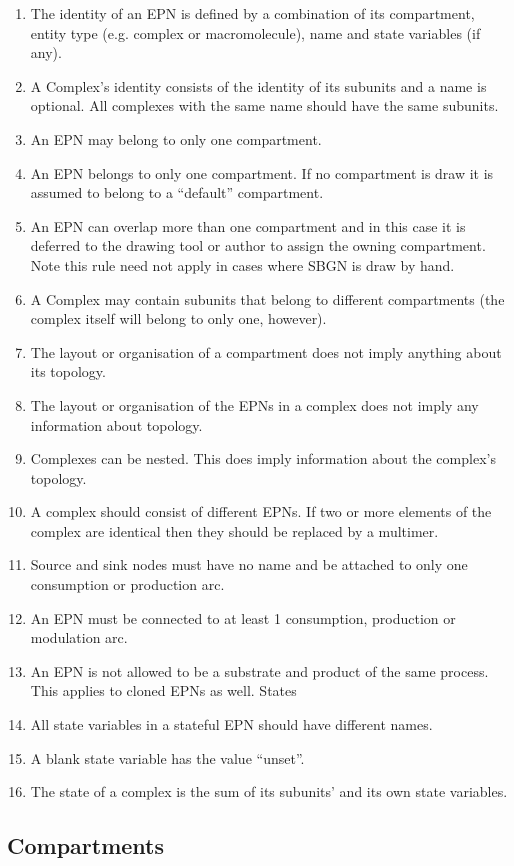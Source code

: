 \begin{enumerate}
\item The identity of an EPN is defined by a combination of its compartment, entity type (e.g. complex or macromolecule), name and state variables (if any).
\item A Complex’s identity consists of the identity of its subunits and a name is optional. All complexes with the same name should have the same subunits.
\item An EPN may belong to only one compartment.
\item An EPN belongs to only one compartment. If no compartment is draw it is assumed to belong to a “default” compartment.
\item An EPN can overlap more than one compartment and in this case it is deferred to the drawing tool or author to assign the owning compartment. Note this rule need not apply in cases where SBGN is draw by hand.
\item A Complex may contain subunits that belong to different compartments (the complex itself will belong to only one, however).
\item The layout or organisation of a compartment does not imply anything about its topology.
\item The layout or organisation of the EPNs in a complex does not imply any information about topology.
\item Complexes can be nested. This does imply information about the complex’s topology.
\item A complex should consist of different EPNs. If two or more elements of the complex are identical then they should be replaced by a multimer.
\item Source and sink nodes must have no name and be attached to only one consumption or production arc.
\item An EPN must be connected to at least 1 consumption, production or modulation arc.
\item An EPN is not allowed to be a substrate and product of the same process. This applies to cloned EPNs as well.
States
\item All state variables in a stateful EPN should have different names.
\item A blank state variable has the value “unset”.
\item The state of a complex is the sum of its subunits’ and its own state variables.
\end{enumerate}

\subsection{Compartments}


